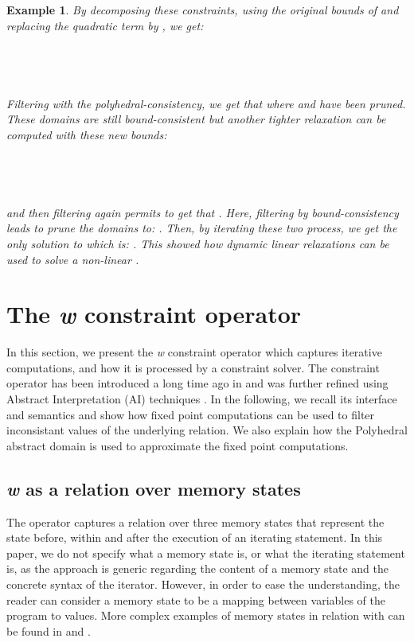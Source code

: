 \documentclass[submission,copyright,creativecommons]{eptcs}
\newtheorem{example}{Example}
\begin{document}
\begin{example}
\noindent
By decomposing these constraints, using the original bounds of  and 
replacing the quadratic term  by , we get:\\
\\ 
\\
\\
\\
Filtering with the polyhedral-consistency, we get that
 where  and  have been pruned.
These domains are still bound-consistent but 
another tighter relaxation can be computed with these new bounds:\\
\\
\\
\\
\\
and then filtering again permits to get that
.
Here, filtering by bound-consistency leads to prune the domains to:
.
Then, by iterating these two process, we get the only solution to  which is:
.
This showed how dynamic linear relaxations can be used to solve a non-linear .
\end{example}

\section{The \textit{w} constraint operator}

In this section, we present the {\it w} constraint operator which captures iterative computations, and how it is processed by a constraint solver. 
The constraint operator has been introduced a long time ago in \cite{GBR98,GBR00} and was further refined using Abstract Interpretation (AI) techniques \cite{DGD07a}. In the following, we recall its interface and semantics and show how fixed point computations can be used to filter 
inconsistant values of the underlying relation. We also explain
how the Polyhedral abstract domain is used to approximate the fixed point computations.

\subsection{\textit{w} as a relation over memory states}
The  operator captures a relation over three memory states that represent the state before, within and after the execution of an iterating statement.
In this paper, we do not specify what a memory state is, or what the iterating statement is, as the approach is generic regarding the content of a memory state and the concrete syntax of the iterator. However, in order to ease the understanding, the reader can consider a memory state to be a mapping between variables of the program to values. More complex examples of memory states in relation with  can be found in \cite{CBG09} and \cite{CG10}.
\end{document}
